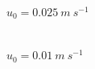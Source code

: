\documentclass[serif,compress, blue, 11pt]{beamer}
\begin{document}
{\begin{figure}
\begin{minipage}{0.47\linewidth}
\tiny{$u_0=0.025\ m\ s^{-1}$}
\end{minipage}
\begin{minipage}{0.47\linewidth}
 \\
\tiny{$u_0=0.01\ m\ s^{-1}$}
\end{minipage}
\end{figure}
}
\end{document}
